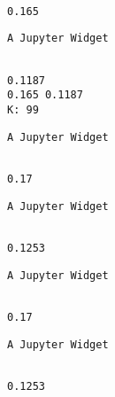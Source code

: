 \documentclass[11pt]{article}
\begin{document}
    
    \begin{Verbatim}[commandchars=\\\{\}]

0.165

    \end{Verbatim}

    
    \begin{verbatim}
A Jupyter Widget
    \end{verbatim}

    
    \begin{Verbatim}[commandchars=\\\{\}]

0.1187
0.165 0.1187
K: 99

    \end{Verbatim}

    
    \begin{verbatim}
A Jupyter Widget
    \end{verbatim}

    
    \begin{Verbatim}[commandchars=\\\{\}]

0.17

    \end{Verbatim}

    
    \begin{verbatim}
A Jupyter Widget
    \end{verbatim}

    
    \begin{Verbatim}[commandchars=\\\{\}]

0.1253

    \end{Verbatim}

    
    \begin{verbatim}
A Jupyter Widget
    \end{verbatim}

    
    \begin{Verbatim}[commandchars=\\\{\}]

0.17

    \end{Verbatim}

    
    \begin{verbatim}
A Jupyter Widget
    \end{verbatim}

    
    \begin{Verbatim}[commandchars=\\\{\}]

0.1253

    \end{Verbatim}
\end{document}
